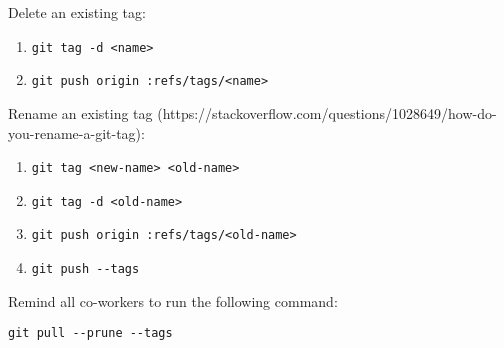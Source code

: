 \documentclass{article}
\begin{document}
Delete an existing tag:
\begin{enumerate}
    \item 
    \begin{verbatim}
git tag -d <name>
    \end{verbatim}
    \item
    \begin{verbatim}
git push origin :refs/tags/<name>
    \end{verbatim}
\end{enumerate}

Rename an existing tag (https://stackoverflow.com/questions/1028649/how-do-you-rename-a-git-tag):
\begin{enumerate}
    \item 
    \begin{verbatim}
git tag <new-name> <old-name>
    \end{verbatim}
    \item
    \begin{verbatim}
git tag -d <old-name>
    \end{verbatim}
    \item
    \begin{verbatim}
git push origin :refs/tags/<old-name>
    \end{verbatim}
    \item
    \begin{verbatim}
git push --tags
    \end{verbatim}
\end{enumerate}

Remind all co-workers to run the following command:
\begin{verbatim}
git pull --prune --tags
\end{verbatim}
\end{document}
